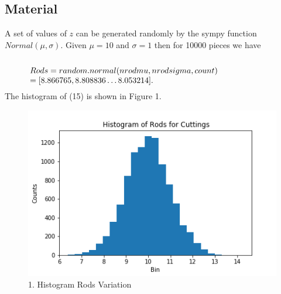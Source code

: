 \documentclass[10pt,journal,compsoc]{IEEEtran} \ifCLASSOPTIONcompsoc
\begin{document}
\noindent \subsection{Material}  A set of values of $z$ can be generated     randomly by the sympy function \\ $Normal(\mu, \sigma)$. Given  $\mu = 10 $ and $\sigma = 1 $ then for 10000 pieces we have \\ \\ 
\begin{equation}
\begin{minipage}{300pt}
 $\displaystyle Rods = random.normal(nrodmu, nrodsigma, count) \\ = [8.866765, 8.808836 \dots 8.053214]. $  
\end{minipage}
\end{equation}
\noindent The histogram of (15) is shown in Figure 1.
\begin{figure}[H]
\centering\includegraphics[width=1\linewidth,height=0.25\textheight]{Fig01}
\caption{1. Histogram Rods Variation}
\label{fig:Fig01}
\end{figure}
\end{document}
